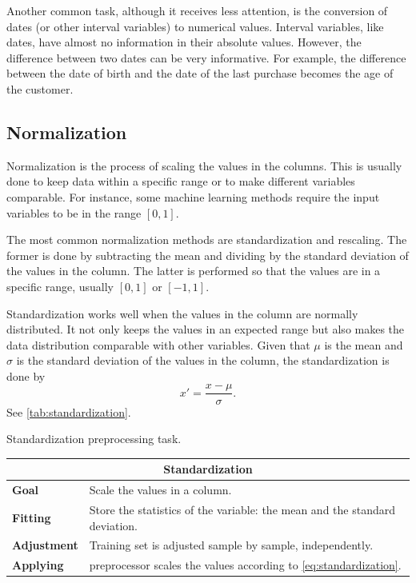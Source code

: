 Another common task, although it receives less attention, is the conversion of dates (or
other interval variables) to numerical values.  Interval variables, like dates, have
almost no information in their absolute values.  However, the difference between two
dates can be very informative.  For example, the difference between the date of birth and
the date of the last purchase becomes the age of the customer.

\subsection{Normalization}

Normalization is the process of scaling the values in the columns.  This is usually done to
keep data within a specific range or to make different variables comparable.  For instance,
some machine
learning methods require the input variables to be in the range $[0, 1]$.

The most common normalization methods are standardization and rescaling.  The former is done
by subtracting the mean and dividing by the standard deviation of the values in the column.
The latter is performed so that the values are in a specific range, usually $[0, 1]$ or $[-1, 1]$.

Standardization works well when the values in the column are normally distributed.
It not only keeps the values in an expected range but also makes the data distribution
comparable with other variables.  Given that $\mu$ is the mean and $\sigma$ is the
standard deviation of the values in the column, the standardization is done by
\begin{equation}
  \label{eq:standardization}
  x' = \frac{x - \mu}{\sigma}\text{.}
\end{equation}
See \cref{tab:standardization}.

\begin{tablebox}[label=tab:standardization]{Standardization preprocessing task.}
  \centering
  \begin{tabular}{lp{6cm}}
    \toprule
    \multicolumn{2}{c}{\textbf{Standardization}} \\
    \midrule
    \textbf{Goal} &
      Scale the values in a column. \\
    \textbf{Fitting} &
      Store the statistics of the variable: the mean and the standard deviation. \\
    \textbf{Adjustment} &
      Training set is adjusted sample by sample, independently. \\
    \textbf{Applying} &
      \Gls{preprocessor} scales the values according to \cref{eq:standardization}. \\
    \bottomrule
  \end{tabular}
\end{tablebox}

